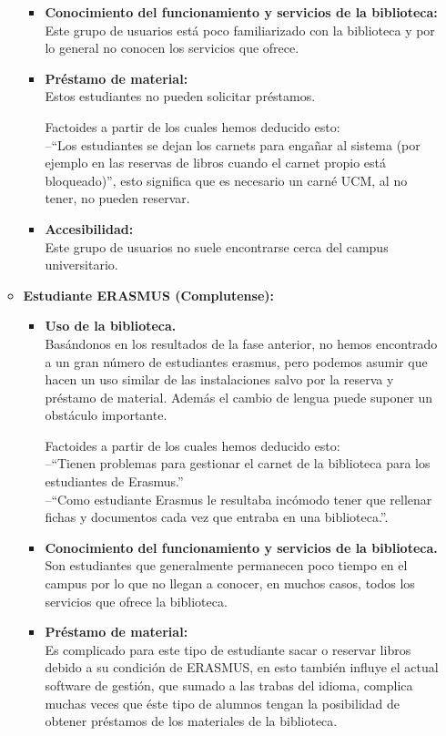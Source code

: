 \documentclass[12pt]{article}
\begin{document}
\begin{itemize}
\begin{itemize}
\begin{itemize}
		\item \textbf{Conocimiento del funcionamiento y servicios de la biblioteca: \\}
			Este grupo de usuarios está poco familiarizado con la biblioteca y por lo general no conocen los servicios que ofrece.

		\item \textbf{Préstamo de material: \\}
			Estos estudiantes no pueden solicitar préstamos.

			Factoides a partir de los cuales hemos deducido esto: \\
			--``Los estudiantes se dejan los carnets para engañar al sistema (por ejemplo en las reservas de libros cuando el carnet propio está bloqueado)'', esto significa que es necesario un carné UCM, al no tener, no pueden reservar.

		\item \textbf{Accesibilidad: \\}
			Este grupo de usuarios no suele encontrarse cerca del campus universitario.

	\end{itemize}
	\item \textbf{Estudiante ERASMUS (Complutense): }
	\begin{itemize}
		\item \textbf{Uso de la biblioteca. \\}
			Basándonos en los resultados de la fase anterior, no hemos encontrado a un gran número de estudiantes erasmus, pero podemos asumir que hacen un uso similar de las instalaciones salvo por la reserva y préstamo de material. Además el cambio de lengua puede suponer un obstáculo importante.

			Factoides a partir de los cuales hemos deducido esto: \\--``Tienen problemas para gestionar el carnet de la biblioteca para los estudiantes de Erasmus.'' \\ --``Como estudiante Erasmus le resultaba incómodo tener que rellenar fichas y documentos cada vez que entraba en una biblioteca.''.

		\item \textbf{Conocimiento del funcionamiento y servicios de la biblioteca. \\}
			Son estudiantes que generalmente permanecen poco tiempo en el campus por lo que no llegan a conocer, en muchos casos, todos los servicios que ofrece la biblioteca.

		\item \textbf{Préstamo de material: \\}
			Es complicado para este tipo de estudiante sacar o reservar libros debido a su condición de ERASMUS, en esto también influye el actual software de gestión, que sumado a las trabas del idioma, complica muchas veces que éste tipo de alumnos tengan la posibilidad de obtener préstamos de los materiales de la biblioteca.


\end{itemize}
\end{itemize}
\end{itemize}
\end{document}
